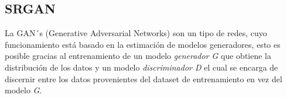\subsection{SRGAN}

La GAN´s (Generative Adversarial Networks) son un tipo de redes, cuyo funcionamiento está basado
en la estimación de modelos generadores, esto es posible gracias al entrenamiento de un modelo 
\emph{generador G} que obtiene la distribución de los datos y un modelo \emph{discriminador D} 
el cual se encarga de discernir entre los datos provenientes del dataset de entrenamiento en vez
del modelo \emph{G}.